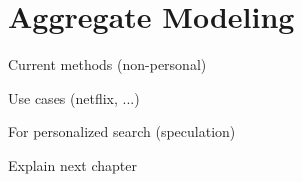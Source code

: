 \section{Aggregate Modeling}
\label{sec:aggregate}
Current methods (non-personal)

Use cases (netflix, ...)

For personalized search (speculation)

Explain next chapter



